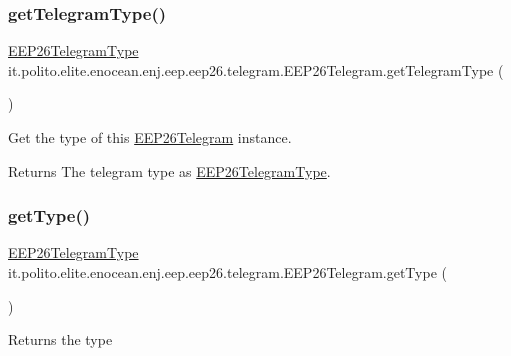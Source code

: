 \subsubsection{\texorpdfstring{get\+Telegram\+Type()}{getTelegramType()}}
{\footnotesize\ttfamily \hyperlink{enumit_1_1polito_1_1elite_1_1enocean_1_1enj_1_1eep_1_1eep26_1_1telegram_1_1_e_e_p26_telegram_type}{E\+E\+P26\+Telegram\+Type} it.\+polito.\+elite.\+enocean.\+enj.\+eep.\+eep26.\+telegram.\+E\+E\+P26\+Telegram.\+get\+Telegram\+Type (\begin{DoxyParamCaption}{ }\end{DoxyParamCaption})}

Get the type of this \hyperlink{classit_1_1polito_1_1elite_1_1enocean_1_1enj_1_1eep_1_1eep26_1_1telegram_1_1_e_e_p26_telegram}{E\+E\+P26\+Telegram} instance.

\begin{DoxyReturn}{Returns}
The telegram type as \hyperlink{enumit_1_1polito_1_1elite_1_1enocean_1_1enj_1_1eep_1_1eep26_1_1telegram_1_1_e_e_p26_telegram_type}{E\+E\+P26\+Telegram\+Type}. 
\end{DoxyReturn}
\hypertarget{classit_1_1polito_1_1elite_1_1enocean_1_1enj_1_1eep_1_1eep26_1_1telegram_1_1_e_e_p26_telegram_aa15d1e6c9c829860c894cb90042c8abf}{}\label{classit_1_1polito_1_1elite_1_1enocean_1_1enj_1_1eep_1_1eep26_1_1telegram_1_1_e_e_p26_telegram_aa15d1e6c9c829860c894cb90042c8abf} 
\subsubsection{\texorpdfstring{get\+Type()}{getType()}}
{\footnotesize\ttfamily \hyperlink{enumit_1_1polito_1_1elite_1_1enocean_1_1enj_1_1eep_1_1eep26_1_1telegram_1_1_e_e_p26_telegram_type}{E\+E\+P26\+Telegram\+Type} it.\+polito.\+elite.\+enocean.\+enj.\+eep.\+eep26.\+telegram.\+E\+E\+P26\+Telegram.\+get\+Type (\begin{DoxyParamCaption}{ }\end{DoxyParamCaption})}

\begin{DoxyReturn}{Returns}
the type 
\end{DoxyReturn}


